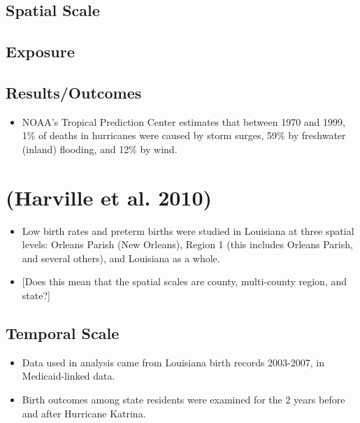 \documentclass[
]{article}
\providecommand{\tightlist}{%
  \setlength{\itemsep}{0pt}\setlength{\parskip}{0pt}}
\begin{document}
\hypertarget{spatial-scale-13}{%
\subsection{Spatial Scale}\label{spatial-scale-13}}

\hypertarget{exposure-12}{%
\subsection{Exposure}\label{exposure-12}}

\hypertarget{resultsoutcomes-11}{%
\subsection{Results/Outcomes}\label{resultsoutcomes-11}}

\begin{itemize}
\tightlist
\item
  NOAA's Tropical Prediction Center estimates that between 1970 and
  1999, 1\% of deaths in hurricanes were caused by storm surges, 59\% by
  freshwater (inland) flooding, and 12\% by wind.
\end{itemize}

\hypertarget{harville2010population}{%
\section{(Harville et al. 2010)}\label{harville2010population}}

\begin{itemize}
\tightlist
\item
  Low birth rates and preterm births were studied in Louisiana at three
  spatial levels: Orleans Parish (New Orleans), Region 1 (this includes
  Orleans Parish, and several others), and Louisiana as a whole.
\item
  {[}Does this mean that the spatial scales are county, multi-county
  region, and state?{]}
\end{itemize}

\hypertarget{temporal-scale-14}{%
\subsection{Temporal Scale}\label{temporal-scale-14}}

\begin{itemize}
\tightlist
\item
  Data used in analysis came from Louisiana birth records 2003-2007, in
  Medicaid-linked data.
\item
  Birth outcomes among state residents were examined for the 2 years
  before and after Hurricane Katrina.
\end{itemize}
\end{document}
